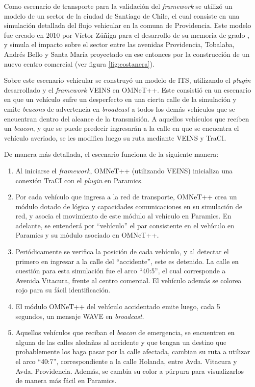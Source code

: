 Como escenario de transporte para la validación del \emph{framework} se utilizó un modelo de un sector de la ciudad de Santiago de Chile, el cual consiste en una simulación detallada del flujo vehicular en la comuna de Providencia. Este modelo fue creado en 2010 por Víctor Zúñiga para el desarrollo de su memoria de grado \autocite{zuniga}, y simula el impacto sobre el sector entre las avenidas Providencia, Tobalaba, Andrés Bello y Santa María proyectado en ese entonces por la construcción de un nuevo centro comercial (ver figura \ref{fig:costanera}).

Sobre este escenario vehicular se construyó un modelo de ITS, utilizando el \emph{plugin} desarrollado y el \emph{framework} VEINS en OMNeT++. Este consistió en un escenario en que un vehículo sufre un desperfecto en una cierta calle de la simulación y emite \emph{beacons} de advertencia en \emph{broadcast} a todos los demás vehículos que se encuentran dentro del alcance de la transmisión. A aquellos vehículos que reciben un \emph{beacon}, y que se puede predecir ingresarán a la calle en que se encuentra el vehículo averiado, se les modifica luego su ruta mediante VEINS y TraCI.

De manera más detallada, el escenario funciona de la siguiente manera:

\begin{enumerate}
    \item Al iniciarse el \emph{framework}, OMNeT++ (utilizando VEINS) inicializa una conexión TraCI con el \emph{plugin} en Paramics.
    \item Por cada vehículo que ingresa a la red de transporte, OMNeT++ crea un módulo dotado de lógica y capacidades comunicaciones en su simulación de red, y asocia el movimiento de este módulo al vehículo en Paramics. En adelante, se entenderá por ``vehículo'' el par consistente en el vehículo en Paramics y su módulo asociado en OMNeT++.
    \item Periódicamente se verifica la posición de cada vehículo, y al detectar el primero en ingresar a la calle del ``accidente'', este es detenido. La calle en cuestión para esta simulación fue el arco ``40:5'', el cual corresponde a Avenida Vitacura, frente al centro comercial. El vehículo además se colorea rojo para su fácil identificación.
    \item El módulo OMNeT++ del vehículo accidentado emite luego, cada 5 segundos, un mensaje WAVE \autocite{80211wave} en \emph{broadcast}.
    \item Aquellos vehículos que reciban el \emph{beacon} de emergencia, se encuentren en alguna de las calles aledañas al accidente y que tengan un destino que probablemente los haga pasar por la calle afectada, cambian su ruta a utilizar el arco ``40:7'', correspondiente a la calle Holanda, entre Avda. Vitacura y Avda. Providencia. Además, se cambia su color a púrpura para visualizarlos de manera más fácil en Paramics.
\end{enumerate}

